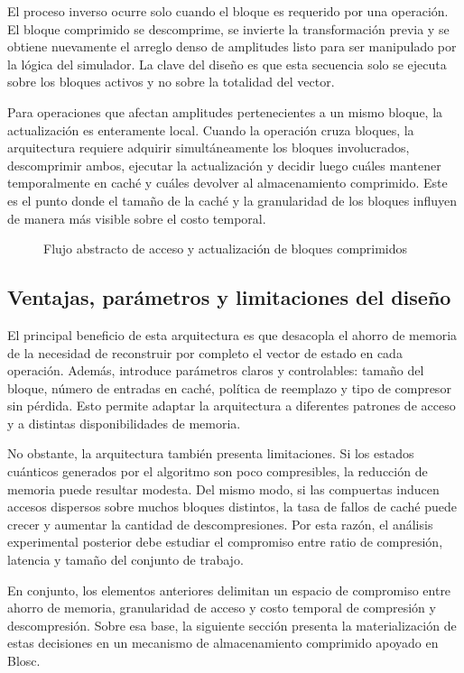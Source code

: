 El proceso inverso ocurre solo cuando el bloque es requerido por una operación. El bloque comprimido se descomprime, se invierte la transformación
previa y se obtiene nuevamente el arreglo denso de amplitudes listo para ser manipulado por la lógica del simulador. La clave del diseño es que esta
secuencia solo se ejecuta sobre los bloques activos y no sobre la totalidad del vector.

Para operaciones que afectan amplitudes pertenecientes a un mismo bloque, la actualización es enteramente local. Cuando la operación cruza bloques,
la arquitectura requiere adquirir simultáneamente los bloques involucrados, descomprimir ambos, ejecutar la actualización y decidir luego cuáles
mantener temporalmente en caché y cuáles devolver al almacenamiento comprimido. Este es el punto donde el tamaño de la caché y la granularidad de los
bloques influyen de manera más visible sobre el costo temporal.

\begin{figure}[H]
    \centering
    \caption{Flujo abstracto de acceso y actualización de bloques comprimidos}
    \label{fig:simulation-design-flow}
\end{figure}

\subsection{Ventajas, parámetros y limitaciones del diseño}

El principal beneficio de esta arquitectura es que desacopla el ahorro de memoria de la necesidad de reconstruir por completo el vector de estado en
cada operación. Además, introduce parámetros claros y controlables: tamaño del bloque, número de entradas en caché, política de reemplazo y tipo de
compresor sin pérdida. Esto permite adaptar la arquitectura a diferentes patrones de acceso y a distintas disponibilidades de memoria.

No obstante, la arquitectura también presenta limitaciones. Si los estados cuánticos generados por el algoritmo son poco compresibles, la reducción
de memoria puede resultar modesta. Del mismo modo, si las compuertas inducen accesos dispersos sobre muchos bloques distintos, la tasa de fallos de
caché puede crecer y aumentar la cantidad de descompresiones. Por esta razón, el análisis experimental posterior debe estudiar el compromiso entre
ratio de compresión, latencia y tamaño del conjunto de trabajo.

En conjunto, los elementos anteriores delimitan un espacio de compromiso entre ahorro de
memoria, granularidad de acceso y costo temporal de compresión y descompresión. Sobre esa
base, la siguiente sección presenta la materialización de estas decisiones en un mecanismo de
almacenamiento comprimido apoyado en Blosc.

